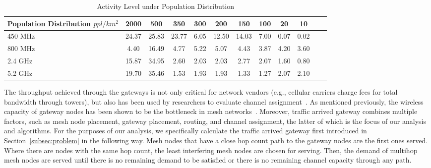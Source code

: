 \begin{table}
\centering %
\begin{tabular}{|l|c|c|c|c|c|c|c|c|c|c|c|} %
\hline %
Population Distribution $ppl/km^2$ & 2000 & 500 & 350 & 300 &  200 & 150 & 100 & 20 & 10 \\ %
\hline %
450 MHz &24.37	&25.83  &23.77	&6.05 &12.50  &14.03 & 7.00 & 0.07 & 0.02 \\      
\hline %
800 MHz &4.40 	&16.49  &4.77	&5.22&5.07 &4.43  & 3.87 & 4.20 & 3.60 \\      
\hline %
2.4 GHz &15.87 	&34.95  &2.60	&2.03&2.03 &2.77  & 2.07 & 1.60 & 0.80 \\      
\hline %
5.2 GHz &19.70	&35.46  &1.53	&1.93&1.93 &1.33  & 1.27 & 2.07 & 2.10 \\      
\hline %
\end{tabular}    
\caption{Activity Level under Population Distribution} %
\label{tab:activitymeasurement}    
\vspace{-0.3in}
\end{table}    



The throughput achieved through the gateways is not only critical for network vendors (e.g., cellular
carriers charge fees for total bandwidth through towers), but also has been used by researchers
to evaluate channel assignment~\cite{avallone2008channel}.  As mentioned previously, the wireless
capacity of gateway nodes has been shown to be the bottleneck in mesh networks~\cite{robinson2010deploying}.
Moreover, traffic arrived gateway combines multiple factors, such as mesh node placement, gateway placement, 
routing, and channel assignment, the latter of which is the focus of our analysis and algorithms. 
For the purposes of our analysis, we specifically calculate the traffic arrived gateway first introduced
in Section~\ref{subsec:problem} in the following way.  Mesh nodes that have a close hop count path to the gateway
nodes are the first ones served. Where there are nodes with the same hop count, the least interfering
mesh nodes are chosen for serving. Then, the demand of multihop mesh nodes are served 
until there is no remaining demand to be satisfied or there is no remaining channel capacity through any path.

